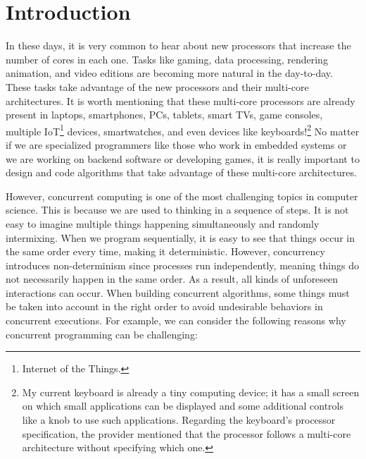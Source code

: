 \chapter{\label{chapter:1_Introduction}Introduction}

In these days, it is very common to hear about new processors that increase the number of cores in each one. Tasks like gaming, data processing, rendering animation, and video editions are becoming more natural in the day-to-day. These tasks take advantage of the new processors and their multi-core architectures. It is worth mentioning that these multi-core processors are already present in laptops, smartphones, PCs, tablets, smart TVs, game consoles, multiple IoT\footnote{Internet of the Things.} devices, smartwatches, and even devices like keyboards!\footnote{My current keyboard is already a tiny computing device; it has a small screen on which small applications can be displayed and some additional controls like a knob to use such applications. Regarding the keyboard's processor specification, the provider mentioned that the processor follows a multi-core architecture without specifying which one.} No matter if we are specialized programmers like those who work in embedded systems or we are working on backend software or developing games, it is really important to design and code algorithms that take advantage of these multi-core architectures.

However, concurrent computing is one of the most challenging topics in computer science. This is because we are used to thinking in a sequence of steps. It is not easy to imagine multiple things happening simultaneously and randomly intermixing. When we program sequentially, it is easy to see that things occur in the same order every time, making it deterministic. However, concurrency introduces non-determinism since processes run independently, meaning things do not necessarily happen in the same order. As a result, all kinds of unforeseen interactions can occur. When building concurrent algorithms, some things must be taken into account in the right order to avoid undesirable behaviors in concurrent executions. For example, we can consider the following reasons why concurrent programming can be challenging:

